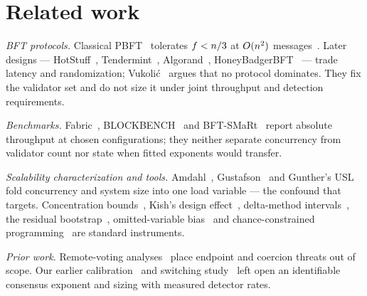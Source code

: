\section{Related work}
\label{sec:related}

\emph{BFT protocols.}
Classical PBFT~\cite{castro1999} tolerates $f<n/3$ at $O(n^{2})$
messages~\cite{lamport1982,dwork1988}. Later designs ---
HotStuff~\cite{yin2019}, Tendermint~\cite{buchman2016},
Algorand~\cite{gilad2017}, HoneyBadgerBFT~\cite{miller2016} --- trade latency
and randomization; Vukoli\'{c}~\cite{vukolic2015} argues that no protocol
dominates. They fix the validator set and do not size it under joint
throughput and detection requirements.

\emph{Benchmarks.}
Fabric~\cite{androulaki2018,thakkar2018}, BLOCKBENCH~\cite{dinh2017} and
BFT-SMaRt~\cite{sousa2018} report absolute throughput at chosen configurations;
they neither separate concurrency from validator count nor state when fitted
exponents would transfer.

\emph{Scalability characterization and tools.}
Amdahl~\cite{amdahl1967}, Gustafson~\cite{gustafson1988} and Gunther's
USL~\cite{gunther2007} fold concurrency and system size into one load variable
--- the confound that \RNM{} targets. Concentration
bounds~\cite{hoeffding1963,boucheron2013}, Kish's design
effect~\cite{kish1965}, delta-method intervals~\cite{seber2003}, the residual
bootstrap~\cite{efron1993}, \mbox{omitted-variable} bias~\cite{wooldridge2010}
and chance-constrained programming~\cite{charnes1959,nemirovski2007} are
standard instruments.

\emph{Prior work.}
Remote-voting analyses~\cite{springall2014,specter2020,park2021} place endpoint
and coercion threats out of scope. Our earlier
calibration~\cite{peniak2026a} and switching study~\cite{peniak2026b} left open
an identifiable consensus exponent and sizing with measured detector rates.

